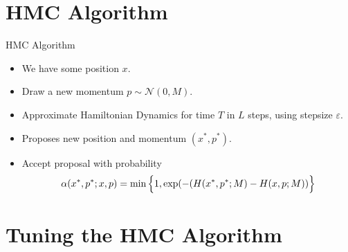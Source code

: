 \documentclass{beamer}
\begin{document}







\section{HMC Algorithm}

\begin{frame}{HMC Algorithm}
\begin{itemize}

\item We have some position $x$.

\item Draw a new momentum $ p \sim \mathcal{N}(0, M)$.

\item Approximate Hamiltonian Dynamics for time $T$ in $L$ steps, using stepsize $\varepsilon$. 

\item Proposes new position and momentum $(x^{*}, p^{*})$. 

\item Accept proposal with probability $$ \alpha(x^{*}, p^{*} ;x, p) = \min \Big{\{} 1, \exp(-(H(x^{*}, p^{*};M) - H(x,p;M)) \Big{\}} $$
\end{itemize}

\end{frame}


\section{Tuning the HMC Algorithm}
\end{document}
